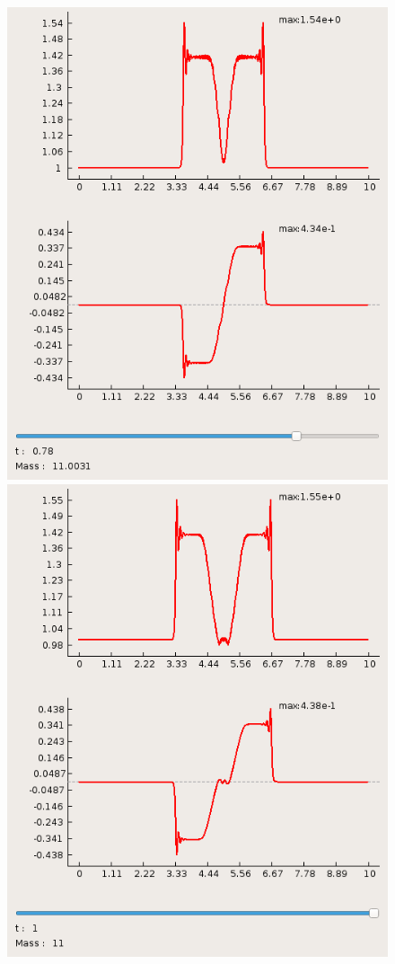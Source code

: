 \documentclass[a4paper, 11pt]{article}
\begin{document}
\begin{figure}[h]
	\begin{minipage}[h] {0.49\linewidth}
		\includegraphics[width=1\linewidth]{p1/p1_t=0,78.png}
	\end{minipage}
	\begin{minipage}[h] {0.49\linewidth}
		\includegraphics[width=1\linewidth]{p1/p1_t=1.png}

\end{minipage}
\end{figure}
\end{document}
